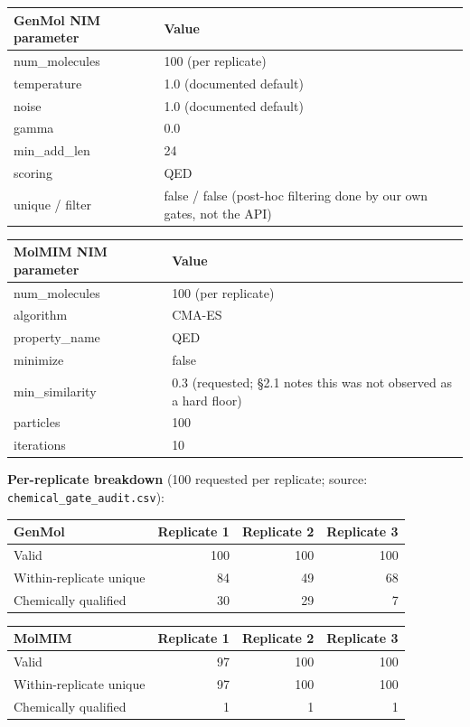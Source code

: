 \documentclass{article}
\begin{document}
\begin{table}[h]
\centering
\footnotesize
\begin{tabular}{ll}
\toprule
GenMol NIM parameter & Value \\
\midrule
num\_molecules & 100 (per replicate) \\
temperature & 1.0 (documented default) \\
noise & 1.0 (documented default) \\
gamma & 0.0 \\
min\_add\_len & 24 \\
scoring & QED \\
unique / filter & false / false (post-hoc filtering done by our own gates, not the API) \\
\bottomrule
\end{tabular}
\hspace{1em}
\begin{tabular}{ll}
\toprule
MolMIM NIM parameter & Value \\
\midrule
num\_molecules & 100 (per replicate) \\
algorithm & CMA-ES \\
property\_name & QED \\
minimize & false \\
min\_similarity & 0.3 (requested; \S2.1 notes this was not observed as a hard floor) \\
particles & 100 \\
iterations & 10 \\
\bottomrule
\end{tabular}
\end{table}

\textbf{Per-replicate breakdown} (100 requested per replicate; source: \texttt{chemical\_gate\_audit.csv}):

\begin{table}[h]
\centering
\footnotesize
\begin{tabular}{lrrr}
\toprule
GenMol & Replicate 1 & Replicate 2 & Replicate 3 \\
\midrule
Valid & 100 & 100 & 100 \\
Within-replicate unique & 84 & 49 & 68 \\
Chemically qualified & 30 & 29 & 7 \\
\bottomrule
\end{tabular}
\hspace{1em}
\begin{tabular}{lrrr}
\toprule
MolMIM & Replicate 1 & Replicate 2 & Replicate 3 \\
\midrule
Valid & 97 & 100 & 100 \\
Within-replicate unique & 97 & 100 & 100 \\
Chemically qualified & 1 & 1 & 1 \\
\bottomrule
\end{tabular}
\end{table}
\end{document}
